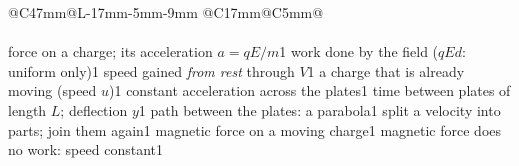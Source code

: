{\small
\setlength\LTpre{9pt}\setlength\LTpost{6pt}
\renewcommand\arraystretch{1.0}
\begin{longtable}{@{}C{47mm}@{\hspace{3mm}}L{\dimexpr\linewidth-47mm-17mm-5mm-9mm\relax}%
    @{\hspace{3mm}}C{17mm}@{\hspace{3mm}}C{5mm}@{}}
  \essfshead\\\hline\endfirsthead
  \essfshead\\\hline\endhead
    {force on a charge; its acceleration $a = qE/m$}{1}
    {work done by the field ($qEd$: uniform only)}{1}
    {speed gained \emph{from rest} through $V$}{1}
    {a charge that is already moving (speed $u$)}{1}
    {constant acceleration across the plates}{1}
    {time between plates of length $L$; deflection $y$}{1}
    {path between the plates: a parabola}{1}
    {split a velocity into parts; join them again}{1}
    {magnetic force on a moving charge}{1}
    {magnetic force does no work: speed constant}{1}

\end{longtable}}

